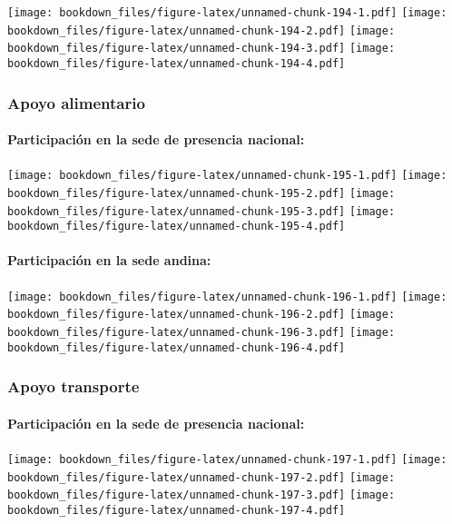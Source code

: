 \documentclass[]{article}
\let\oldparagraph\paragraph
\renewcommand{\paragraph}[1]{\oldparagraph{#1}\mbox{}}
\theoremstyle{definition}
\theoremstyle{definition}
\theoremstyle{definition}
\theoremstyle{remark}
\begin{document}
\texttt{[image: bookdown\_files/figure-latex/unnamed-chunk-194-1.pdf]}
\texttt{[image: bookdown\_files/figure-latex/unnamed-chunk-194-2.pdf]}
\texttt{[image: bookdown\_files/figure-latex/unnamed-chunk-194-3.pdf]}
\texttt{[image: bookdown\_files/figure-latex/unnamed-chunk-194-4.pdf]}

\subsubsection{Apoyo alimentario}\label{apoyo-alimentario-1}

\paragraph{Participación en la sede de presencia
nacional:}\label{participacion-en-la-sede-de-presencia-nacional-10}

\texttt{[image: bookdown\_files/figure-latex/unnamed-chunk-195-1.pdf]}
\texttt{[image: bookdown\_files/figure-latex/unnamed-chunk-195-2.pdf]}
\texttt{[image: bookdown\_files/figure-latex/unnamed-chunk-195-3.pdf]}
\texttt{[image: bookdown\_files/figure-latex/unnamed-chunk-195-4.pdf]}

\paragraph{Participación en la sede
andina:}\label{participacion-en-la-sede-andina-10}

\texttt{[image: bookdown\_files/figure-latex/unnamed-chunk-196-1.pdf]}
\texttt{[image: bookdown\_files/figure-latex/unnamed-chunk-196-2.pdf]}
\texttt{[image: bookdown\_files/figure-latex/unnamed-chunk-196-3.pdf]}
\texttt{[image: bookdown\_files/figure-latex/unnamed-chunk-196-4.pdf]}

\subsubsection{Apoyo transporte}\label{apoyo-transporte-1}

\paragraph{Participación en la sede de presencia
nacional:}\label{participacion-en-la-sede-de-presencia-nacional-11}

\texttt{[image: bookdown\_files/figure-latex/unnamed-chunk-197-1.pdf]}
\texttt{[image: bookdown\_files/figure-latex/unnamed-chunk-197-2.pdf]}
\texttt{[image: bookdown\_files/figure-latex/unnamed-chunk-197-3.pdf]}
\texttt{[image: bookdown\_files/figure-latex/unnamed-chunk-197-4.pdf]}
\end{document}
